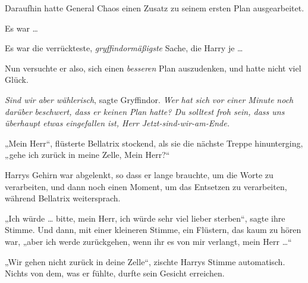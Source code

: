 Daraufhin hatte General Chaos einen Zusatz zu seinem ersten Plan ausgearbeitet.

Es war …

Es war die verrückteste, \emph{gryffindormäßigste} Sache, die Harry je …

Nun versuchte er also, sich einen \emph{besseren} Plan auszudenken, und hatte nicht viel Glück.

\emph{Sind wir aber wählerisch}, sagte Gryffindor. \emph{Wer} \emph{hat sich} \emph{vor einer Minute} \emph{noch} \emph{darüber} \emph{beschwert, dass er keinen Plan hatte? Du solltest froh sein, dass uns überhaupt etwas eingefallen ist, Herr Jetzt-sind-wir-am-Ende.}

„Mein Herr“, flüsterte Bellatrix stockend, als sie die nächste Treppe hinunterging, „gehe ich zurück in meine Zelle, Mein Herr?“

Harrys Gehirn war abgelenkt, so dass er lange brauchte, um die Worte zu verarbeiten, und dann noch einen Moment, um das Entsetzen zu verarbeiten, während Bellatrix weitersprach.

„Ich würde … bitte, mein Herr, ich würde sehr viel lieber sterben“, sagte ihre Stimme. Und dann, mit einer kleineren Stimme, ein Flüstern, das kaum zu hören war, „aber ich werde zurückgehen, wenn ihr es von mir verlangt, mein Herr …“

„Wir gehen nicht zurück in deine Zelle“, zischte Harrys Stimme automatisch. Nichts von dem, was er fühlte, durfte sein Gesicht erreichen.

